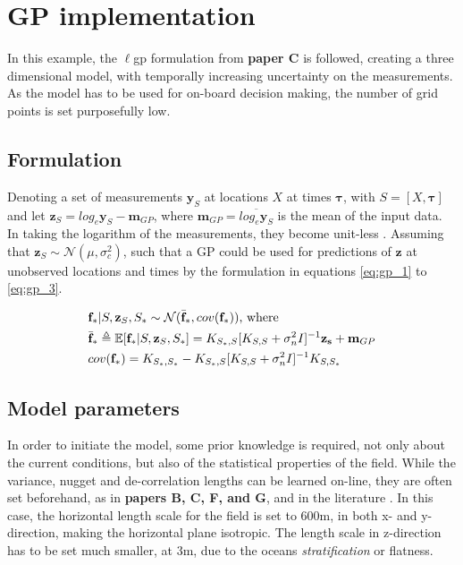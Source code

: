 \section{GP implementation}
In this example, the $\ell$\acrshort{gp} formulation from \textbf{paper C} is followed, creating a three dimensional model, with temporally increasing uncertainty on the measurements. As the model has to be used for on-board decision making, the number of grid points is set purposefully low. 

\subsection{Formulation}
 Denoting a set of measurements $\mathbf{y}_{S}$ at locations $X$ at times $\mathbf{\tau}$, with $S = [X,\mathbf{\tau}]$ and let $\mathbf{z}_{S} = log_e \mathbf{y}_{S} - \mathbf{m}_{GP}$, where $\mathbf{m}_{GP} = \overline{log_e \mathbf{y}_{S}}$ is the mean of the input data. In taking the logarithm of the measurements, they become unit-less \cite{matta2011can}. Assuming that $\mathbf{z}_{S} \sim \mathcal{N}(\mu,\sigma_c^2) $, such that a GP could be used for predictions of $\mathbf{z}$ at unobserved locations and times by the formulation in equations \eqref{eq:gp_1} to \eqref{eq:gp_3}\cite{rasmussen2003gaussian}.

\begin{align}
    \label{eq:gp_1}
    & \mathbf{f}_*|S,\mathbf{z}_S,S_* \sim \mathcal{N}(\Bar{\mathbf{f}}_*,cov(\mathbf{f}_*))\text{, where} \\
    \label{eq:gp_2}
    & \Bar{\mathbf{f}}_* \triangleq \mathbb{E}[\mathbf{f}_*|S,\mathbf{z}_S,S_*] =  K_{S_*,S}[K_{S,S}+\sigma_n^2 I]^{-1}\mathbf{z_s} + \mathbf{m}_{GP} \\
    \label{eq:gp_3}
    & cov(\mathbf{f}_*) = K_{S_*,S_*} - K_{S_*,S}[K_{S,S}+\sigma_n^2 I]^{-1}K_{S,S_*}
\end{align}

\subsection{Model parameters}
In order to initiate the model, some prior knowledge is required, not only about the current conditions, but also of the statistical properties of the field. While the variance, nugget and de-correlation lengths can be learned on-line, they are often set beforehand, as in \textbf{papers B, C, F, and G}, and in the literature \cite{kemna2016adaptive,kemna2018multi,fossum2019toward,fossum2018information}. In this case, the horizontal length scale for the field is set to $600$m, in both x- and y-direction, making the horizontal plane isotropic. The length scale in z-direction has to be set much smaller, at $3$m, due to the oceans \textit{stratification} or flatness. 


